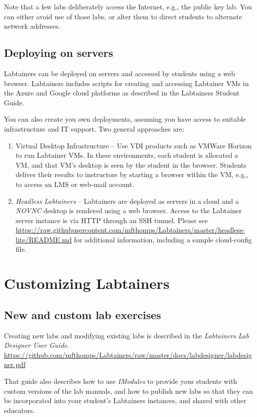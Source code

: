 \documentclass[12pt]{article}
\begin{document}
Note that a few labs deliberately access the Internet, e.g., the public key lab.  You can either avoid use
of those labs, or alter them to direct students to alternate network addresses.



\subsection{Deploying on servers}
\label{servers}
Labtainers can be deployed on servers and accessed by students using a web browser.  Labtainers includes
scripts for creating and accessing Labtainer VMs in the Azure and Google cloud platforms as described in
the Labtainers Student Guide.  

You can also create you own deployments, assuming you have access to suitable infrastructure and IT support.  Two general approaches are:
\begin{enumerate}
\item Virtual Desktop Infrastructure -- Use VDI products such as VMWare Horizon 
to run Labtainer VMs. In these environments, each student is allocated a VM, and that VM's desktop is seen 
by the student in the browser.  Students deliver their results to instructors by starting a browser
within the VM, e.g., to access an LMS or web-mail account.
\item \textit{Headless Labtainers} -- Labtainers are deployed as servers in a cloud and a \textit{NOVNC} desktop is 
rendered using a web browser.  Access to the Labtainer server instance is via HTTP through an SSH tunnel.
Please see \url{https://raw.githubusercontent.com/mfthomps/Labtainers/master/headless-lite/README.md} for additional information,
including a sample cloud-config file.
\end{enumerate}

\section{Customizing Labtainers}
\label{customizing}
\subsection{New and custom lab exercises}
Creating new labs and modifying existing labs is described in the \textit{Labtainers Lab Designer User Guide}.
\url{https://github.com/mfthomps/Labtainers/raw/master/docs/labdesigner/labdesigner.pdf}

That guide also describes how to use \textit{IModules} to provide your students with custom versions of the lab manuals, and how to
publish new labs so that they can be incorporated into your student's Labtainers instances, and shared
with other educators.
\end{document}
